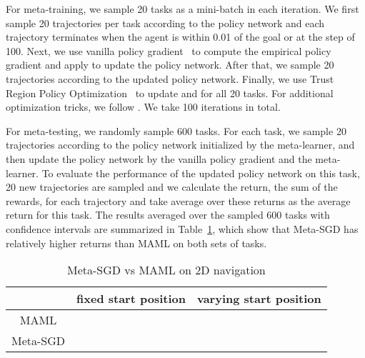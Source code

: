 \documentclass{article}
\begin{document}
For meta-training, we sample 20 tasks as a mini-batch in each iteration. We first sample 20 trajectories per task according to the policy network and each trajectory terminates when the agent is within 0.01 of the goal or at the step of 100. Next, we use vanilla policy gradient~\cite{williams1992simple} to compute the empirical policy gradient  and apply  to update the policy network. After that, we sample 20 trajectories according to the updated policy network. Finally, we use Trust Region Policy Optimization~\cite{schulman2015trust} to update  and  for all 20 tasks. For additional optimization tricks, we follow \cite{finn2017model}. We take 100 iterations in total.

For meta-testing, we randomly sample 600 tasks. For each task, we sample 20 trajectories according to the policy network initialized by the meta-learner, and then update the policy network by the vanilla policy gradient and the meta-learner. To evaluate the performance of the updated policy network on this task, 20 new trajectories are sampled and we calculate the return, the sum of the rewards, for each trajectory and take average over these returns as the average return for this task. The results averaged over the sampled 600 tasks with  confidence intervals are summarized in Table~\ref{tab:res_reinforcement}, which show that Meta-SGD has relatively higher returns than MAML on both sets of tasks.

\begin{table}[h]
  \centering
\begin{center}
    \caption{Meta-SGD vs MAML on 2D navigation}
\label{tab:res_reinforcement}
    \vspace{0.1cm}
    \begin{tabular}{|c|c|c|}
      \hline
      & fixed start position & varying start position \\
      \hline
      MAML &  &  \\
      \hline
      Meta-SGD &  &  \\
      \hline
    \end{tabular}
  \end{center}
\vspace{-0.0cm}
\end{table}
\end{document}
